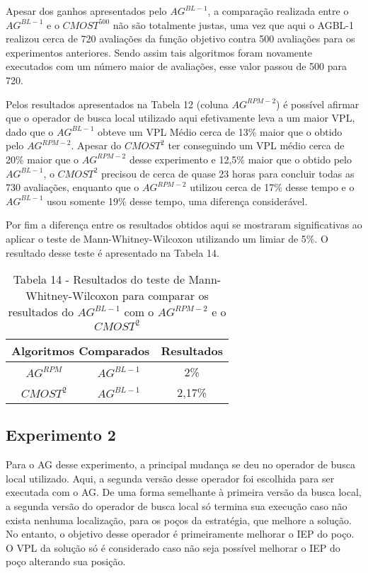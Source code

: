 Apesar dos ganhos apresentados pelo $AG^{BL-1}$, a comparação realizada entre o $AG^{BL-1}$ e o $CMOST^{500}$ não são totalmente justas, uma vez que aqui o AGBL-1 realizou cerca de 720 avaliações da função objetivo contra 500 avaliações para os experimentos anteriores. Sendo assim tais algoritmos foram novamente executados com um número maior de avaliações, esse valor passou de 500 para 720. 

Pelos resultados apresentados na Tabela 12 (coluna $AG^{RPM-2}$) é possível afirmar que o operador de busca local utilizado aqui efetivamente leva a um maior VPL, dado que o $AG^{BL-1}$ obteve um VPL Médio cerca de 13\% maior que o obtido pelo $AG^{RPM-2}$. Apesar do $CMOST^{2}$ ter conseguindo um VPL médio cerca de 20\% maior que o $AG^{RPM-2}$ desse experimento e 12,5\% maior que o obtido pelo $AG^{BL-1}$, o $CMOST^{2}$ precisou de cerca de quase 23 horas para concluir todas as 730 avaliações, enquanto que o $AG^{RPM-2}$ utilizou cerca de 17\% desse tempo e o $AG^{BL-1}$ usou somente 19\% desse tempo, uma diferença considerável.

Por fim a diferença entre os resultados obtidos aqui se mostraram significativas ao aplicar o teste de Mann-Whitney-Wilcoxon utilizando um limiar de 5\%. O resultado desse teste é apresentado na Tabela 14.

\begin{table}[htb]
\centering
\caption{Tabela 14 - Resultados do teste de Mann-Whitney-Wilcoxon para comparar os resultados do $AG^{BL-1}$ com o $AG^{RPM-2}$ e o $CMOST^{2}$}

\begin{tabular}{|c|c|c|}
\hline
\multicolumn{2}{|c|}{Algoritmos Comparados} & Resultados \\ \hline
$AG^{RPM}$  &  $AG^{BL-1}$ & 2\% \\ \hline
$CMOST^{2}$ & $AG^{BL-1}$ & 2,17\% \\ \hline

\end{tabular}
\end{table}

\subsection{Experimento 2}

Para o AG desse experimento, a principal mudança se deu no operador de busca local utilizado. Aqui, a segunda versão desse operador foi escolhida para ser executada com o AG. De uma forma semelhante à primeira versão da busca local, a segunda versão do operador de busca local só termina sua execução caso não exista nenhuma localização, para os poços da estratégia, que melhore a solução. No entanto, o objetivo desse operador é primeiramente melhorar o IEP do poço. O VPL da solução só é considerado caso não seja possível melhorar o IEP do poço alterando sua posição.

